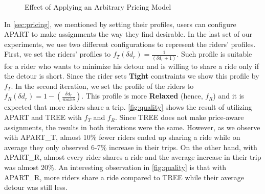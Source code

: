 \begin{figure}[h]
	\centering
    \vspace{-0.15in}
    \caption{Effect of Applying an Arbitrary Pricing Model}
    \label{fig:tkde}
\end{figure}

In \cref{sec:pricing}, we mentioned by setting their profiles, users can configure APART to make assignments the way they find desirable. In the last set of our experiments, we use two different configurations to represent the riders' profiles. First, we set the riders' profiles to $f_T(\delta d_r) = \frac{1}{(\delta d_r + 1)}$. Such profile is suitable for a rider who wants to minimize his detour and is willing to share a ride only if the detour is short. Since the rider sets \textbf{Tight} constraints we show this profile by $f_T$. In the second iteration, we set the profile of the riders to $f_R(\delta d_r) = 1 -  (\frac{\delta d_r}{max \delta})$. This profile is more \textbf{Relaxed} (hence, $f_R$) and it is expected that more riders share a trip. \cref{fig:quality} shows the result of utilizing APART and TREE with $f_T$ and $f_R$. Since TREE does not make price-aware assignments, the results in both iterations were the same. However, as we observe with APART\_T, almost 10\% fewer riders ended up sharing a ride while on average they only observed 6-7\% increase in their trips. On the other hand, with APART\_R, almost every rider shares a ride and the average increase in their trip was almost 20\%. An interesting observation in \cref{fig:quality} is that with APART\_R, more riders share a ride compared to TREE while their average detour was still less.

